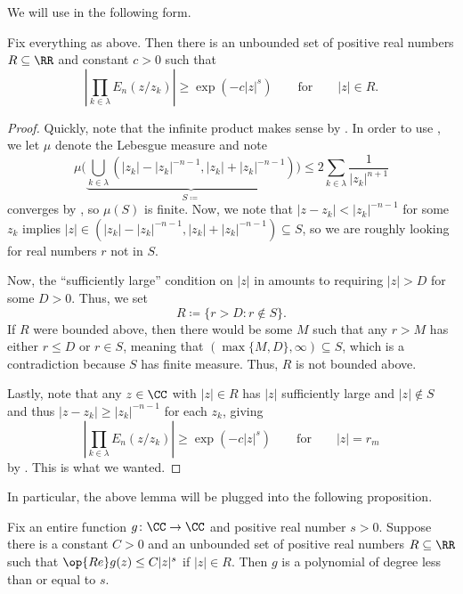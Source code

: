 \documentclass[notes.tex]{subfiles}
\begin{document}
We will use  in the following form.
\begin{lemma} \label{lem:better-elem-prod-lower-bound}
	Fix everything as above. Then there is an unbounded set of positive real numbers $R\subseteq\RR$ and constant $c>0$ such that
	\[\left|\prod_{k\in\lambda} E_n(z/z_k)\right|\ge\exp\left(-c|z|^s\right)\qquad\text{for}\qquad|z|\in R.\]
\end{lemma}
\begin{proof}
	Quickly, note that the infinite product makes sense by . In order to use , we let $\mu$ denote the Lebesgue measure and note
	\[\mu\Bigg(\underbrace{\bigcup_{k\in\lambda}\left(|z_k|-|z_k|^{-n-1},|z_k|+|z_k|^{-n-1}\right)}_{S\coloneqq}\Bigg)\le2\sum_{k\in\lambda}\frac1{|z_k|^{n+1}}\]
	converges by , so $\mu(S)$ is finite. Now, we note that $|z-z_k|<|z_k|^{-n-1}$ for some $z_k$ implies $|z|\in\left(|z_k|-|z_k|^{-n-1},|z_k|+|z_k|^{-n-1}\right)\subseteq S$, so we are roughly looking for real numbers $r$ not in $S$.

	Now, the ``sufficiently large'' condition on $|z|$ in  amounts to requiring $|z|>D$ for some $D>0$. Thus, we set
	\[R\coloneqq\{r>D:r\notin S\}.\]
	If $R$ were bounded above, then there would be some $M$ such that any $r>M$ has either $r\le D$ or $r\in S$, meaning that $(\max\{M,D\},\infty)\subseteq S$, which is a contradiction because $S$ has finite measure. Thus, $R$ is not bounded above.

	Lastly, note that any $z\in\CC$ with $|z|\in R$ has $|z|$ sufficiently large and $|z|\notin S$ and thus $|z-z_k|\ge|z_k|^{-n-1}$ for each $z_k$, giving
	\[\left|\prod_{k\in\lambda} E_n(z/z_k)\right|\ge\exp\left(-c|z|^s\right)\qquad\text{for}\qquad|z|=r_m\]
	by . This is what we wanted.
\end{proof}
In particular, the above lemma will be plugged into the following proposition.
\begin{proposition} \label{prop:bounded-re-is-poly}
	Fix an entire function $g\colon\CC\to\CC$ and positive real number $s>0$. Suppose there is a constant $C>0$ and an unbounded set of positive real numbers $R\subseteq\RR$ such that $\op{Re}g(z)\le C|z|^s$ if $|z|\in R$. Then $g$ is a polynomial of degree less than or equal to $s$.
\end{proposition}
\end{document}
